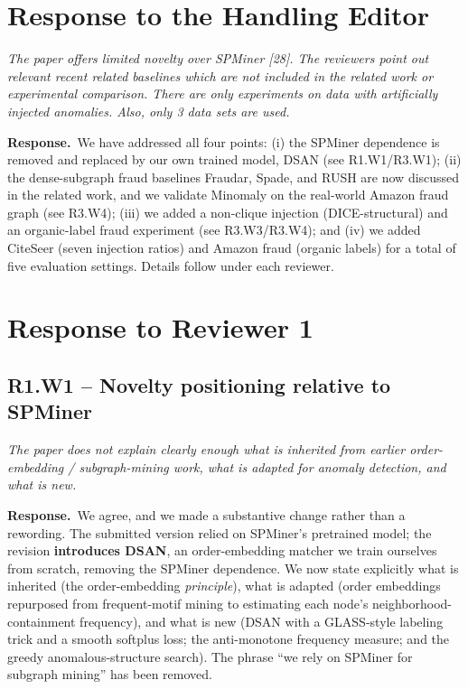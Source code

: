\documentclass[11pt]{article}
\newcommand{\comment}[1]{\begin{reviewerbox}\itshape #1\end{reviewerbox}}
\newcommand{\response}{\par\noindent\textbf{\textcolor{respgreen}{Response.}}\ }
\begin{document}
\section{Response to the Handling Editor}
\comment{The paper offers limited novelty over SPMiner [28]. The reviewers point out relevant recent related baselines which are not included in the related work or experimental comparison. There are only experiments on data with artificially injected anomalies. Also, only 3 data sets are used.}
\response We have addressed all four points: (i) the SPMiner dependence is removed and replaced by our own trained model, DSAN (see R1.W1/R3.W1); (ii) the dense-subgraph fraud baselines Fraudar, Spade, and RUSH are now discussed in the related work, and we validate Minomaly on the real-world Amazon fraud graph (see R3.W4); (iii) we added a non-clique injection (DICE-structural) and an organic-label fraud experiment (see R3.W3/R3.W4); and (iv) we added CiteSeer (seven injection ratios) and Amazon fraud (organic labels) for a total of five evaluation settings. Details follow under each reviewer.

\section{Response to Reviewer 1}

\subsection*{R1.W1 -- Novelty positioning relative to SPMiner}
\comment{The paper does not explain clearly enough what is inherited from earlier order-embedding / subgraph-mining work, what is adapted for anomaly detection, and what is new.}
\response We agree, and we made a substantive change rather than a rewording. The submitted version relied on SPMiner's pretrained model; the revision \textbf{introduces DSAN}, an order-embedding matcher we train ourselves from scratch, removing the SPMiner dependence. We now state explicitly what is inherited (the order-embedding \emph{principle}), what is adapted (order embeddings repurposed from frequent-motif mining to estimating each node's neighborhood-containment frequency), and what is new (DSAN with a GLASS-style labeling trick and a smooth softplus loss; the anti-monotone frequency measure; and the greedy anomalous-structure search). The phrase ``we rely on SPMiner for subgraph mining'' has been removed.
\end{document}
